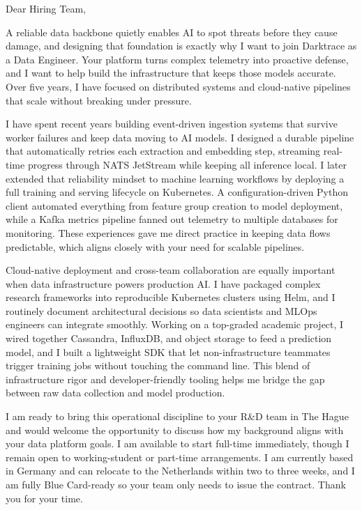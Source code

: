 \documentclass[11pt,a4paper]{coverletter}
\begin{document}

\opening{Dear Hiring Team,}

A reliable data backbone quietly enables AI to spot threats before they cause damage, and designing that foundation is exactly why I want to join Darktrace as a Data Engineer. Your platform turns complex telemetry into proactive defense, and I want to help build the infrastructure that keeps those models accurate. Over five years, I have focused on distributed systems and cloud-native pipelines that scale without breaking under pressure.

I have spent recent years building event-driven ingestion systems that survive worker failures and keep data moving to AI models. I designed a durable pipeline that automatically retries each extraction and embedding step, streaming real-time progress through NATS JetStream while keeping all inference local. I later extended that reliability mindset to machine learning workflows by deploying a full training and serving lifecycle on Kubernetes. A configuration-driven Python client automated everything from feature group creation to model deployment, while a Kafka metrics pipeline fanned out telemetry to multiple databases for monitoring. These experiences gave me direct practice in keeping data flows predictable, which aligns closely with your need for scalable pipelines.

Cloud-native deployment and cross-team collaboration are equally important when data infrastructure powers production AI. I have packaged complex research frameworks into reproducible Kubernetes clusters using Helm, and I routinely document architectural decisions so data scientists and MLOps engineers can integrate smoothly. Working on a top-graded academic project, I wired together Cassandra, InfluxDB, and object storage to feed a prediction model, and I built a lightweight SDK that let non-infrastructure teammates trigger training jobs without touching the command line. This blend of infrastructure rigor and developer-friendly tooling helps me bridge the gap between raw data collection and model production.

I am ready to bring this operational discipline to your R\&D team in The Hague and would welcome the opportunity to discuss how my background aligns with your data platform goals. I am available to start full-time immediately, though I remain open to working-student or part-time arrangements. I am currently based in Germany and can relocate to the Netherlands within two to three weeks, and I am fully Blue Card-ready so your team only needs to issue the contract. Thank you for your time.
\end{document}
